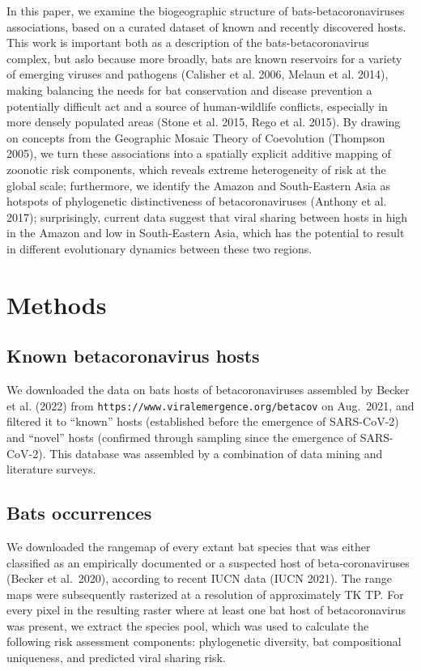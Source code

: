 \documentclass[10pt,oneside]{article}
\begin{document}
In this paper, we examine the biogeographic structure of
bats-betacoronaviruses associations, based on a curated dataset of known
and recently discovered hosts. This work is important both as a
description of the bats-betacoronavirus complex, but aslo because more
broadly, bats are known reservoirs for a variety of emerging viruses and
pathogens (Calisher et al. 2006, Melaun et al. 2014), making balancing
the needs for bat conservation and disease prevention a potentially
difficult act and a source of human-wildlife conflicts, especially in
more densely populated areas (Stone et al. 2015, Rego et al. 2015). By
drawing on concepts from the Geographic Mosaic Theory of Coevolution
(Thompson 2005), we turn these associations into a spatially explicit
additive mapping of zoonotic risk components, which reveals extreme
heterogeneity of risk at the global scale; furthermore, we identify the
Amazon and South-Eastern Asia as hotspots of phylogenetic
distinctiveness of betacoronaviruses (Anthony et al. 2017);
surprisingly, current data suggest that viral sharing between hosts in
high in the Amazon and low in South-Eastern Asia, which has the
potential to result in different evolutionary dynamics between these two
regions.

\hypertarget{methods}{%
\section{Methods}\label{methods}}

\hypertarget{known-betacoronavirus-hosts}{%
\subsection{Known betacoronavirus
hosts}\label{known-betacoronavirus-hosts}}

We downloaded the data on bats hosts of betacoronaviruses assembled by
Becker et al. (2022) from
\texttt{https://www.viralemergence.org/betacov} on Aug.~2021, and
filtered it to ``known'' hosts (established before the emergence of
SARS-CoV-2) and ``novel'' hosts (confirmed through sampling since the
emergence of SARS-CoV-2). This database was assembled by a combination
of data mining and literature surveys.

\hypertarget{bats-occurrences}{%
\subsection{Bats occurrences}\label{bats-occurrences}}

We downloaded the rangemap of every extant bat species that was either
classified as an empirically documented or a suspected host of
beta-coronaviruses (Becker et al.~2020), according to recent IUCN data
(IUCN 2021). The range maps were subsequently rasterized at a resolution
of approximately TK TP. For every pixel in the resulting raster where at
least one bat host of betacoronavirus was present, we extract the
species pool, which was used to calculate the following risk assessment
components: phylogenetic diversity, bat compositional uniqueness, and
predicted viral sharing risk.
\end{document}
